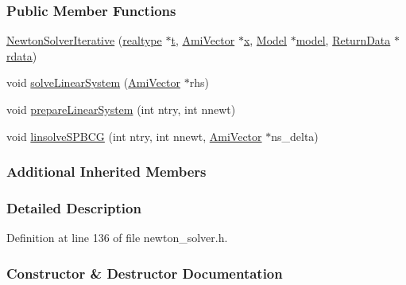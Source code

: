 \subsubsection*{Public Member Functions}
\begin{DoxyCompactItemize}
\item 
\mbox{\hyperlink{classamici_1_1_newton_solver_iterative_a8bea80f27022bfade8a19989cbb10058}{Newton\+Solver\+Iterative}} (\mbox{\hyperlink{namespaceamici_a1bdce28051d6a53868f7ccbf5f2c14a3}{realtype}} $\ast$\mbox{\hyperlink{classamici_1_1_newton_solver_ad94d61da9b85c1a151ffd8e228758c7c}{t}}, \mbox{\hyperlink{classamici_1_1_ami_vector}{Ami\+Vector}} $\ast$\mbox{\hyperlink{classamici_1_1_newton_solver_af64268982dd7b9be1690573763982e0b}{x}}, \mbox{\hyperlink{classamici_1_1_model}{Model}} $\ast$\mbox{\hyperlink{classamici_1_1_newton_solver_a7b56c3ca57dde73bdbc8dbe9772bca19}{model}}, \mbox{\hyperlink{classamici_1_1_return_data}{Return\+Data}} $\ast$\mbox{\hyperlink{classamici_1_1_newton_solver_a4c0807651f0594a186e8856f22e442cc}{rdata}})
\item 
void \mbox{\hyperlink{classamici_1_1_newton_solver_iterative_aced8bda2d8b3051a8632152cb1f7da4a}{solve\+Linear\+System}} (\mbox{\hyperlink{classamici_1_1_ami_vector}{Ami\+Vector}} $\ast$rhs)
\item 
void \mbox{\hyperlink{classamici_1_1_newton_solver_iterative_acb5ad8b8b0ff7ee8d963194ca8c8ed78}{prepare\+Linear\+System}} (int ntry, int nnewt)
\item 
void \mbox{\hyperlink{classamici_1_1_newton_solver_iterative_a89a318e506339bc8a0d05aa01920f1ae}{linsolve\+S\+P\+B\+CG}} (int ntry, int nnewt, \mbox{\hyperlink{classamici_1_1_ami_vector}{Ami\+Vector}} $\ast$ns\+\_\+delta)
\end{DoxyCompactItemize}
\subsubsection*{Additional Inherited Members}


\subsubsection{Detailed Description}


Definition at line 136 of file newton\+\_\+solver.\+h.



\subsubsection{Constructor \& Destructor Documentation}
\mbox{\label{classamici_1_1_newton_solver_iterative_a8bea80f27022bfade8a19989cbb10058}} 
